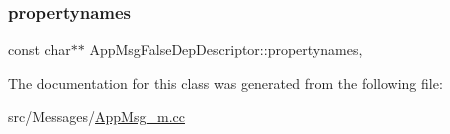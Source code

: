 \subsubsection{\texorpdfstring{propertynames}{propertynames}}
{\footnotesize\ttfamily const char$\ast$$\ast$ App\+Msg\+False\+Dep\+Descriptor\+::propertynames\hspace{0.3cm}{\ttfamily [mutable]}, {\ttfamily [private]}}



The documentation for this class was generated from the following file\+:\begin{DoxyCompactItemize}
\item 
src/\+Messages/\hyperlink{_app_msg__m_8cc}{App\+Msg\+\_\+m.\+cc}\end{DoxyCompactItemize}
